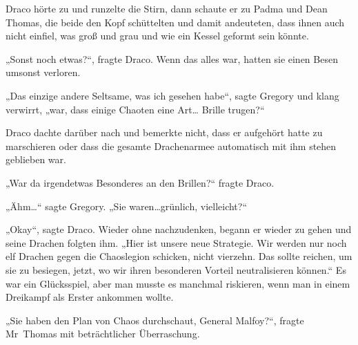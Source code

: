 Draco hörte zu und runzelte die Stirn, dann schaute er zu Padma und Dean Thomas, die beide den Kopf schüttelten und damit andeuteten, dass ihnen auch nicht einfiel, was groß und grau und wie ein Kessel geformt sein könnte.

„Sonst noch etwas?“, fragte Draco. Wenn das alles war, hatten sie einen Besen umsonst verloren.

„Das einzige andere Seltsame, was ich gesehen habe“, sagte Gregory und klang verwirrt, „war, dass einige Chaoten eine Art… Brille trugen?“

Draco dachte darüber nach und bemerkte nicht, dass er aufgehört hatte zu marschieren oder dass die gesamte Drachenarmee automatisch mit ihm stehen geblieben war.

„War da irgendetwas Besonderes an den Brillen?“ fragte Draco.

„Ähm…“ sagte Gregory. „Sie waren…grünlich, vielleicht?“

„Okay“, sagte Draco. Wieder ohne nachzudenken, begann er wieder zu gehen und seine Drachen folgten ihm. „Hier ist unsere neue Strategie. Wir werden nur noch elf Drachen gegen die Chaoslegion schicken, nicht vierzehn. Das sollte reichen, um sie zu besiegen, jetzt, wo wir ihren besonderen Vorteil neutralisieren können.“ Es war ein Glücksspiel, aber man musste es manchmal riskieren, wenn man in einem Dreikampf als Erster ankommen wollte.

„Sie haben den Plan von Chaos durchschaut, General Malfoy?“, fragte Mr~Thomas mit beträchtlicher Überraschung.

